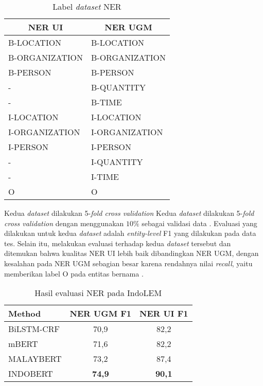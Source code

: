 \begin{table}[h]
    \vspace{0.25cm}
    \centering
    \caption{Label \textit{dataset} NER}
    \label{table:label-ner}
    \begin{tabular}{l|l}
        \toprule
        \multicolumn{1}{c}{\textbf{NER UI}} & \multicolumn{1}{c}{\textbf{NER UGM}} \\
        \midrule
        B-LOCATION & B-LOCATION \\
        B-ORGANIZATION & B-ORGANIZATION \\
        B-PERSON & B-PERSON \\
        - & B-QUANTITY \\
        - & B-TIME \\
        I-LOCATION & I-LOCATION \\
        I-ORGANIZATION & I-ORGANIZATION \\
        I-PERSON & I-PERSON \\
        - & I-QUANTITY \\
        - & I-TIME \\
        O & O \\
        \bottomrule
    \end{tabular}
\end{table}

Kedua \textit{dataset} dilakukan 5-\textit{fold cross validation} Kedua \textit{dataset} dilakukan 5-\textit{fold cross validation} dengan menggunakan $10\%$ sebagai validasi data \parencite{indolem}. Evaluasi yang dilakukan untuk kedua \textit{dataset} adalah \textit{entity-level} F1 yang dilakukan pada data tes. Selain itu, \citeauthor{indolem} melakukan evaluasi terhadap kedua \textit{dataset} tersebut dan ditemukan bahwa kualitas NER UI lebih baik dibandingkan NER UGM, dengan kesalahan pada NER UGM sebagian besar karena rendahnya nilai \textit{recall}, yaitu memberikan label O pada entitas bernama \parencite{indolem}.

\begin{table}[h]
    \vspace{0.25cm}
    \centering
    \caption{Hasil evaluasi NER pada IndoLEM}
    \label{table:indolem-ner-result}
    \begin{tabular}{lcc}
        \toprule
        \textbf{Method} & \textbf{NER UGM F1} & \textbf{NER UI F1} \\
        \midrule
        BiLSTM-CRF & 70,9 & 82,2 \\
        mBERT & 71,6 & 82,2 \\
        MALAYBERT & 73,2 & 87,4 \\
        INDOBERT & \textbf{74,9} & \textbf{90,1} \\
        \bottomrule 
    \end{tabular}
\end{table}

